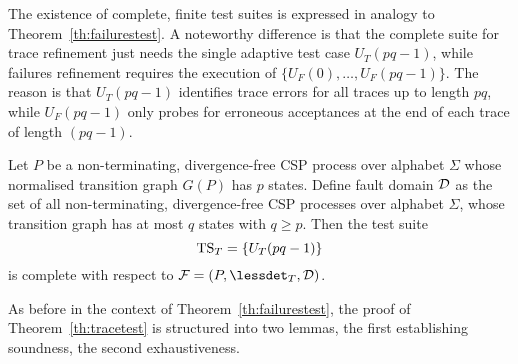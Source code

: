 The existence of complete, finite test suites is expressed in analogy to
Theorem~\ref{th:failurestest}. A noteworthy difference is that the complete
suite for trace refinement just needs the single adaptive test case
$U_T(pq-1)$, while failures refinement requires the execution of $\{
U_F(0),\dots,U_F(pq-1)\}$. The reason is that $U_T(pq-1)$ identifies trace
errors for all traces up to length $pq$, while $U_F(pq-1)$ only probes for
erroneous acceptances at the end of each trace of length $(pq -1)$. 
%
\begin{theorem}\label{th:tracetest}
Let $P$ be a non-terminating, divergence-free CSP process over alphabet $\Sigma$ whose
normalised transition graph $G(P)$ has $p$ states. Define fault domain ${\cal
D}$ as the set of all non-terminating, divergence-free CSP processes over alphabet $\Sigma$,
whose transition graph has at most $q$ states with $q \ge p$. Then the test
suite
\[
{\text{TS}}_T = \{ U_T(pq-1)   \}
\]
is complete with respect to ${\cal F} = (P,\lessdet_T,{\cal D})$.
\xbox
\end{theorem}

As before in the context of Theorem~\ref{th:failurestest}, 
the proof of Theorem~\ref{th:tracetest} is structured into two lemmas, the first 
establishing soundness, the second exhaustiveness.
 
